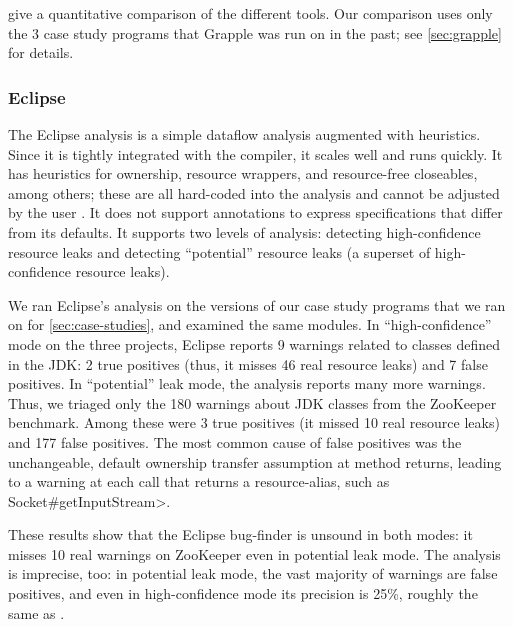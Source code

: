  give a quantitative comparison of the
different tools.  Our comparison uses only the 3 case study programs that Grapple was
run on in the past; see \cref{sec:grapple} for details.




\subsubsection{Eclipse}
\label{sec:eclipse}

The Eclipse analysis is a simple dataflow analysis
augmented with heuristics. Since it is tightly integrated with
the compiler, it scales well and runs quickly. It has
heuristics for ownership, resource wrappers, and resource-free
closeables, among others; these are all hard-coded into the analysis and cannot
be adjusted by the user . It does not support annotations to express
specifications that differ from its defaults.
It supports two levels of analysis: detecting high-confidence resource
leaks and detecting ``potential'' resource
leaks (a superset of high-confidence resource leaks).

We ran Eclipse's analysis on the versions of our case study programs
that we ran \tool on for \cref{sec:case-studies}, and examined
the same modules.
In ``high-confidence'' mode on the three projects, Eclipse reports 9
warnings related to classes defined in the JDK:
2 true positives (thus, it misses 46 real resource leaks) and 7
false positives.
In ``potential'' leak mode, the analysis reports many more warnings.
Thus, we triaged only the 180
warnings about JDK classes from the ZooKeeper benchmark.
Among these were 3 true positives (it missed 10 real resource leaks) and 177 false
positives.
The most common cause of false
positives was the unchangeable, default ownership transfer assumption
at method returns, leading to a warning at each call that returns a resource-alias, such as
\<Socket\#getInputStream>.

These results show that the Eclipse bug-finder is unsound in both
modes: it misses 10 real warnings on ZooKeeper even in potential leak mode.
The analysis is imprecise, too: in potential leak mode,
the vast majority of warnings are false positives, and even in high-confidence
mode its precision is 25\%, roughly the same as \tool.


